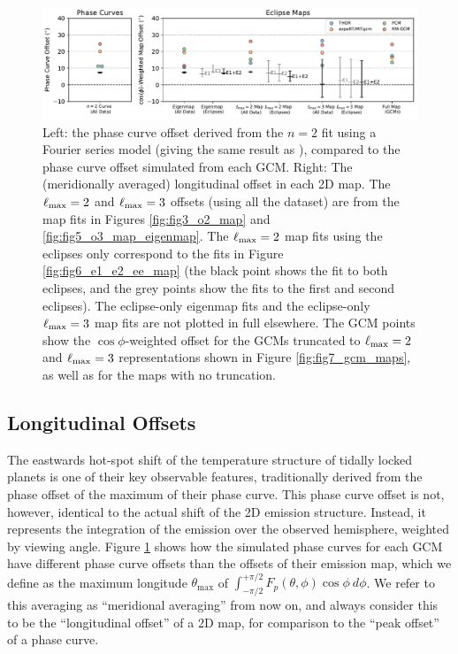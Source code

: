 \documentclass[twocolumn]{aastex631}
\begin{document}
\begin{figure}
    \centering
    \includegraphics[width=\textwidth]{fig9_compare_offsets.pdf}
    \caption{Left: the phase curve offset derived from the $n=2$ fit using a Fourier series model (giving the same result as \citet{bell2023wasp43b}), compared to the phase curve offset simulated from each GCM. Right: The (meridionally averaged) longitudinal offset in each 2D map. The $\ell_{\rm max}=2$ and $\ell_{\rm max}=3$ offsets (using all the dataset) are from the map fits in Figures \ref{fig:fig3_o2_map} and \ref{fig:fig5_o3_map_eigenmap}. The $\ell_{\rm max}=2$ map fits using the eclipses only correspond to the fits in Figure \ref{fig:fig6_e1_e2_ee_map} (the black point shows the fit to both eclipses, and the grey points show the fits to the first and second eclipses). The eclipse-only eigenmap fits and the eclipse-only $\ell_{\rm max}=3$ map fits are not plotted in full elsewhere. The GCM points show the $\cos\phi$-weighted offset for the GCMs truncated to $\ell_{\rm max}=2$ and $\ell_{\rm max}=3$ representations shown in Figure \ref{fig:fig7_gcm_maps}, as well as for the maps with no truncation.} 
    \label{fig:fig9_compare_offsets}
\end{figure}


\subsection{Longitudinal Offsets}\label{sec:discussion:offsets}

The eastwards hot-spot shift of the temperature structure of tidally locked planets is one of their key observable features, traditionally derived from the phase offset of the maximum of their phase curve. This phase curve offset is not, however, identical to the actual shift of the 2D emission structure. Instead, it represents the integration of the emission over the observed hemisphere, weighted by viewing angle. Figure \ref{fig:fig9_compare_offsets} shows how the simulated phase curves for each GCM have different phase curve offsets than the offsets of their emission map, which we define as the maximum longitude $\theta_{\mathrm{max}}$ of $\int^{+\pi/2}_{-\pi/2} F_{p}(\theta,\phi) \cos\phi\ d\phi$. We refer to this averaging as ``meridional averaging'' from now on, and always consider this to be the ``longitudinal offset'' of a 2D map, for comparison to the ``peak offset'' of a phase curve.
\end{document}
